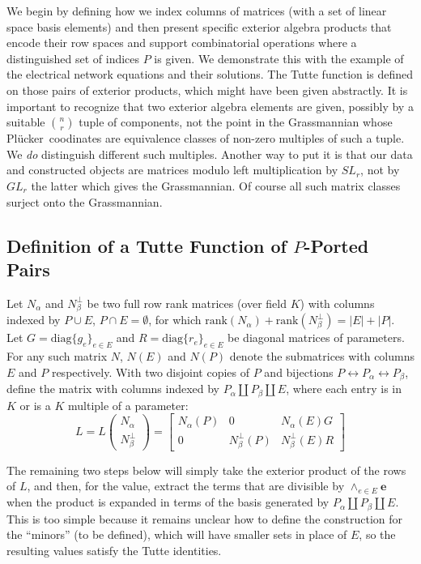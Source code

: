 \documentclass[Unicode]{cedram-alco}
\newcommand{\ext}[1]{\ensuremath{\mathbf{#1}}}
\newcommand{\Plucker}{Pl\"{u}cker\ }
\newcommand{\Nal}{\ensuremath{N_{\alpha}}}
\newcommand{\NbePe}{\ensuremath{N_{\beta}^{\perp}}}
\newcommand{\dunion}{\coprod}
\begin{document}
\noindent
We begin by defining how we index columns of matrices (with a set of
linear space basis elements) and then
present specific
exterior algebra products that encode their row spaces and support
combinatorial operations where a distinguished set of indices $P$ is given.
We demonstrate this with the example
of the electrical network equations and their solutions.
The Tutte function is defined
on those pairs of exterior products, which might have been given abstractly.
It is important to recognize that two exterior algebra elements are given,
possibly by a suitable $\binom{n}{r}$ tuple of components, not the point in the Grassmannian
whose \Plucker coodinates are equivalence classes of non-zero multiples of
such a tuple.  We \emph{do} distinguish different such multiples.  Another way
to put it is that our data and constructed objects are matrices modulo left multiplication
by $SL_r$, not by $GL_r$ the latter which gives the Grassmannian.  Of course all such matrix
classes surject onto the Grassmannian.


\subsection{Definition of a Tutte Function of $P$-Ported Pairs}


Let $\Nal$ and $\NbePe$ be two full row rank matrices (over field $K$)
with
columns indexed by $P\cup E$, $P\cap E=\emptyset$, for which
$\text{rank}(\Nal)+\text{rank}(\NbePe)=|E|+|P|$.  Let
$G=\text{diag}\{g_e\}_{e\in E} $ and $R=\text{diag}\{r_e\}_{e\in E} $
be diagonal matrices of parameters.  For any such matrix $N$, $N(E)$ and
$N(P)$ denote the submatrices with columns $E$ and $P$ respectively. With
two disjoint copies of $P$ and bijections
$P \leftrightarrow P_{\alpha}\leftrightarrow P_{\beta}$, define the matrix
with columns indexed by $P_\alpha \dunion P_\beta \dunion E$, where each entry
is in $K$ or is a $K$ multiple of a parameter:
\[
    L = L\left( \begin{array}{c} \Nal\\ \NbePe \end{array} \right)
    = \left[\begin{array}{c|c|c} \Nal(P)  &  0  &  \Nal(E)G \\  \hline
        0  & \NbePe(P)  &  \NbePe(E)R \end{array}\right]
\]

The remaining two steps below will simply take the exterior product of the rows of $L$, and
then, for the value, extract the terms that are divisible by $\wedge_{e \in E}\ext{e}$ when the product
is expanded in terms of the basis generated by $P_\alpha \dunion P_\beta \dunion E$.
This is too simple because it remains unclear how to define the construction for the
``minors'' (to be defined), which will have smaller sets in place of $E$, so the
resulting values satisfy the Tutte identities. 
\end{document}

